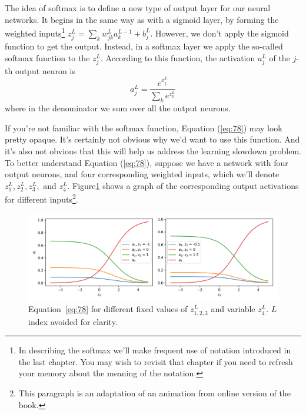 \documentclass[a4paper,twoside,10pt]{book}
\begin{document}
The idea of softmax is to define a new type of output layer for our neural networks. It begins in the same way as with a sigmoid layer, by forming the weighted inputs\footnote{In describing the softmax we'll make frequent use of notation introduced in the last chapter. You may wish to revisit that chapter if you need to refresh your memory about the meaning of the notation.} $z^L_j=\sum_kw^L_{jk}a^{L−1}_k+b^L_j$. However, we don't apply the sigmoid function to get the output. Instead, in a softmax layer we apply the so-called softmax function to the $z^L_j$. According to this function, the activation $a^L_j$ of the $j$-th output neuron is
\begin{equation}
	a^L_j = \frac{e^{x^L_j}}{\sum_ke^{z^L_k}}
	\label{eq:78}
\end{equation}
where in the denominator we sum over all the output neurons.

If you're not familiar with the softmax function, Equation (\ref{eq:78}) may look pretty opaque. It's certainly not obvious why we'd want to use this function. And it's also not obvious that this will help us address the learning slowdown problem. To better understand Equation (\ref{eq:78}), suppose we have a network with four output neurons, and four corresponding weighted inputs, which we'll denote $z^L_1,z^L_2,z^L_3,$ and $z^L_4$. Figure\ref{fig:softmax} shows  a graph of the corresponding output activations for different inputs\footnote{This paragraph is an adaptation of an animation from online version of the book.}.
\begin{figure}

\includegraphics[width=\linewidth]{./figures/ch3/animation_softmax}
\caption{Equation~\ref{eq:78} for different fixed values of $z^L_{1,2,3}$ and variable $z^L_4$. $L$ index avoided for clarity. }
\label{fig:softmax}
\end{figure}
\end{document}
